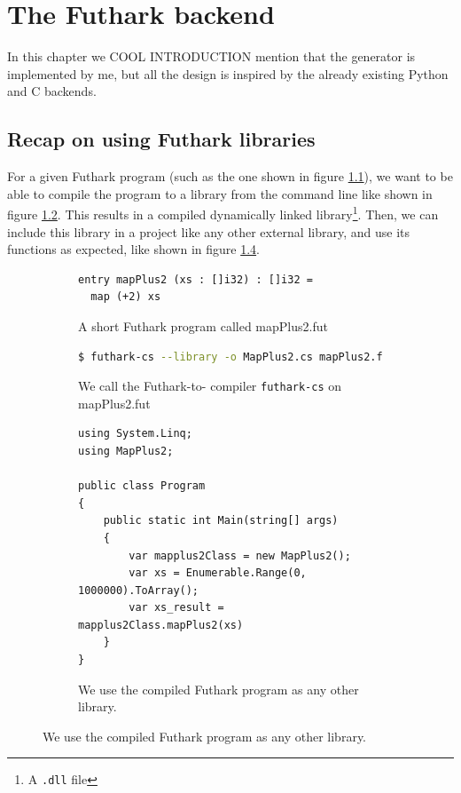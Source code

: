 \chapter{The Futhark \csharp{} backend}
In this chapter we 
COOL INTRODUCTION
mention that the generator is implemented by me, but all the design is inspired
by the already existing Python and C backends.

\section{Recap on using Futhark \csharp{} libraries}
For a given Futhark program (such as the one shown in figure \ref{fig:shortfutharkprogram3'}), 
we want to be able to compile the program to a
\csharp{} library from the command line like shown in figure \ref{fig:shortfutharkprogram4'}.
This results in a compiled \csharp{} dynamically linked library\footnote{A
  \texttt{.dll} file}.
Then, we can include this library in a \csharp{} project like any other external
library, and use its functions as expected, like shown in figure \ref{fig:shortfutharkprogram5'}.

\begin{figure}[H]
\begin{subfigure}
  \centering
  \begin{lstlisting}[language=Futhark]
entry mapPlus2 (xs : []i32) : []i32 =
  map (+2) xs
  \end{lstlisting}
  \caption{A short Futhark program called mapPlus2.fut}
  \label{fig:shortfutharkprogram3'}
\end{subfigure}

\begin{subfigure}
  \centering
  \begin{lstlisting}[language=sh]
$ futhark-cs --library -o MapPlus2.cs mapPlus2.fut
  \end{lstlisting}
  \caption{We call the Futhark-to-\csharp{} compiler \texttt{futhark-cs} on
    mapPlus2.fut}
  \label{fig:shortfutharkprogram4'}
\end{subfigure}

\begin{subfigure}
  \centering
\begin{verbatim}
using System.Linq;
using MapPlus2;

public class Program
{
    public static int Main(string[] args)
    {
        var mapplus2Class = new MapPlus2();
        var xs = Enumerable.Range(0, 1000000).ToArray();
        var xs_result = mapplus2Class.mapPlus2(xs)
    }
}
\end{verbatim}
  \caption{We use the compiled Futhark program as any other library.}
  \label{fig:shortfutharkprogram5'}
\end{subfigure}
\end{figure}

